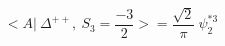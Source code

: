\begin{equation}
<A|~\Delta^{++}, ~S_3=\frac{-3}{2} >= \frac{\sqrt{2}}{\pi} ~\psi_2^{*3}
\end{equation}

